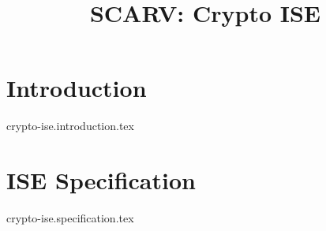 \documentclass{article}
\title{SCARV: Crypto ISE}
\begin{document}
\maketitle
\tableofcontents

\section{Introduction}
{crypto-ise.introduction.tex}

\section{ISE Specification}
{crypto-ise.specification.tex}


\printbibliography
\end{document}
